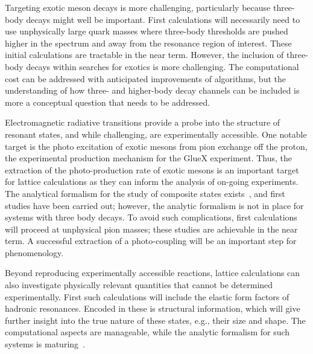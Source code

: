 Targeting exotic meson decays is more challenging, particularly because three-body decays might well be important. First calculations will necessarily need to use unphysically large quark masses where three-body thresholds are pushed higher in the spectrum and away from the resonance region of interest.
These initial calculations are tractable in the near term. However, the inclusion of three-body decays within searches for exotics is more challenging. The computational cost can be addressed with anticipated improvements of algorithms, but the understanding of how three- and higher-body decay channels can be included is more a conceptual question that needs to be addressed.


Electromagnetic radiative transitions provide a probe into the structure of resonant states, and while challenging, are experimentally accessible. 
One notable target is the photo excitation of exotic mesons from pion exchange off the proton, the experimental production mechanism for the GlueX experiment. Thus, the extraction of the photo-production rate of exotic mesons is an important target for lattice calculations as they can inform the analysis of on-going experiments. The analytical formalism for the study of composite states exists~\cite{Briceno:2015tza}, and first studies have been carried out; however, the analytic formalism is not in place for systems with three body decays. To avoid such complications, first calculations will proceed at unphysical pion masses;  these studies are achievable in the near term. A successful extraction of a photo-coupling will be an important step for phenomenology.

Beyond reproducing experimentally accessible reactions, lattice calculations can also investigate physically relevant quantities that cannot be determined experimentally. First such calculations will include the elastic form factors of hadronic resonances. Encoded in these is structural information, which will give further insight into the true nature of these states, e.g., their size and shape. The computational aspects are manageable, while the analytic formalism for such systems is maturing~\cite{Briceno:2015tza,Baroni:2018unx}.


